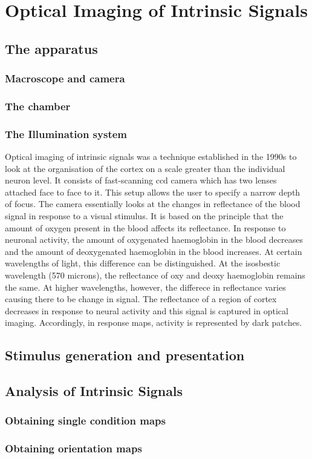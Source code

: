 \section{Optical Imaging of Intrinsic Signals}
	\subsection{The apparatus}
		\subsubsection{Macroscope and camera}
		\subsubsection{The chamber}
		\subsubsection{The Illumination system}
			Optical imaging of intrinsic signals was a technique established in the 1990s to look at the organisation of the cortex on a scale greater than the individual neuron level. It consists of fast-scanning ccd camera which has two lenses attached face to face to it. This setup allows the user to specify a narrow depth of focus. The camera essentially looks at the changes in reflectance of the blood signal in response to a visual stimulus. It is based on the principle that the amount of oxygen present in the blood affects its reflectance. In response to neuronal activity, the amount of oxygenated haemoglobin in the blood decreases and the amount of deoxygenated haemoglobin in the blood increases. At certain wavelengths of light, this difference can be distinguished. At the isosbestic wavelength (570 microns), the reflectance of oxy and deoxy haemoglobin remains the same. At higher wavelengths, however, the differece in reflectance varies causing there to be change in signal. The reflectance of a region of cortex decreases in response to neural activity and this signal is captured in optical imaging. Accordingly, in response maps, activity is represented by dark patches.
	\subsection{Stimulus generation and presentation}
	\subsection{Analysis of Intrinsic Signals}
		\subsubsection{Obtaining single condition maps}
		\subsubsection{Obtaining orientation maps}
